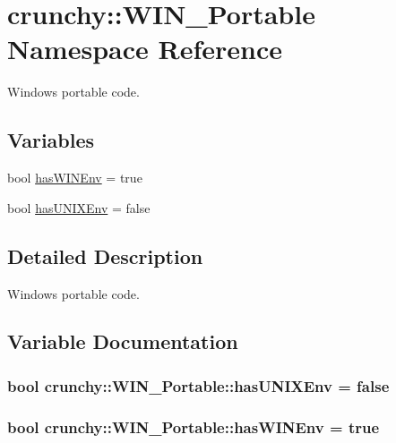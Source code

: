 \hypertarget{namespacecrunchy_1_1_w_i_n___portable}{}\section{crunchy\+:\+:W\+I\+N\+\_\+\+Portable Namespace Reference}
\label{namespacecrunchy_1_1_w_i_n___portable}


Windows portable code.  


\subsection*{Variables}
\begin{DoxyCompactItemize}
\item 
bool \hyperlink{namespacecrunchy_1_1_w_i_n___portable_a13f5917ac7e1b16856ddc1e3fb9ecf77}{has\+W\+I\+N\+Env} = true
\item 
bool \hyperlink{namespacecrunchy_1_1_w_i_n___portable_a7e8302941397585df62313986ab8f50a}{has\+U\+N\+I\+X\+Env} = false
\end{DoxyCompactItemize}


\subsection{Detailed Description}
Windows portable code. 

\subsection{Variable Documentation}
\hypertarget{namespacecrunchy_1_1_w_i_n___portable_a7e8302941397585df62313986ab8f50a}{}
\subsubsection[{has\+U\+N\+I\+X\+Env}]{\setlength{\rightskip}{0pt plus 5cm}bool crunchy\+::\+W\+I\+N\+\_\+\+Portable\+::has\+U\+N\+I\+X\+Env = false}\label{namespacecrunchy_1_1_w_i_n___portable_a7e8302941397585df62313986ab8f50a}
\hypertarget{namespacecrunchy_1_1_w_i_n___portable_a13f5917ac7e1b16856ddc1e3fb9ecf77}{}
\subsubsection[{has\+W\+I\+N\+Env}]{\setlength{\rightskip}{0pt plus 5cm}bool crunchy\+::\+W\+I\+N\+\_\+\+Portable\+::has\+W\+I\+N\+Env = true}\label{namespacecrunchy_1_1_w_i_n___portable_a13f5917ac7e1b16856ddc1e3fb9ecf77}
